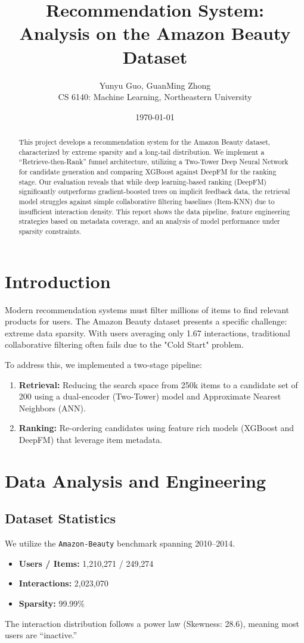 \documentclass[twocolumn, 10pt, a4paper]{article}
\title{\textbf{Recommendation System: \\  Analysis on the Amazon Beauty Dataset}}
\author{Yunyu Guo, GuanMing Zhong \\ 
\small CS 6140: Machine Learning, Northeastern University}
\date{\today}
\begin{document}
\maketitle

\begin{abstract}
This project develops a recommendation system for the Amazon Beauty dataset, characterized by extreme sparsity and a long-tail distribution. We implement a ``Retrieve-then-Rank'' funnel architecture, utilizing a Two-Tower Deep Neural Network for candidate generation and comparing XGBoost against DeepFM for the ranking stage. Our evaluation reveals that while deep learning-based ranking (DeepFM) significantly outperforms gradient-boosted trees on implicit feedback data, the retrieval model struggles against simple collaborative filtering baselines (Item-KNN) due to insufficient interaction density. This report shows the data pipeline, feature engineering strategies based on metadata coverage, and an analysis of model performance under sparsity constraints.
\end{abstract}

\section{Introduction}
Modern recommendation systems must filter millions of items to find relevant products for users. The Amazon Beauty dataset presents a specific challenge: extreme data sparsity. With users averaging only 1.67 interactions, traditional collaborative filtering often fails due to the "Cold Start" problem.

To address this, we implemented a two-stage pipeline:
\begin{enumerate}
    \item \textbf{Retrieval:} Reducing the search space from 250k items to a candidate set of 200 using a dual-encoder (Two-Tower) model and Approximate Nearest Neighbors (ANN).
    \item \textbf{Ranking:} Re-ordering candidates using feature rich models (XGBoost and DeepFM) that leverage item metadata.
\end{enumerate}

\section{Data Analysis and Engineering}

\subsection{Dataset Statistics}
We utilize the \texttt{Amazon-Beauty} benchmark spanning 2010--2014.
\begin{itemize}[noitemsep]
    \item \textbf{Users / Items:} 1,210,271 / 249,274
    \item \textbf{Interactions:} 2,023,070
    \item \textbf{Sparsity:} 99.99\%
\end{itemize}
The interaction distribution follows a power law (Skewness: 28.6), meaning most users are ``inactive.''
\end{document}
